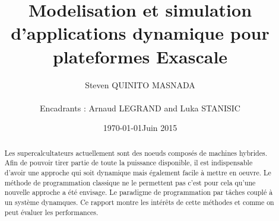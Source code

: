 \documentclass[smallextended]{svjour3}
\date{\today}
\title{}
\begin{document}
\newcommand{\AL}[2][inline]{\todo[color=green!50,#1]{\sf \textbf{AL:} #2}\xspace}
\newcommand{\LS}[2][inline]{\todo[color=green!50,#1]{\sf \textbf{LS:} #2}\xspace}

\let\oldcite=\cite
\renewcommand\cite[2][]{~\ifthenelse{\equal{#1}{}}{\oldcite{#2}}{\oldcite[#1]{#2}}\xspace}
\let\oldref=\ref
\def\ref#1{~\oldref{#1}\xspace}
\def\ie{i.e.,\xspace}
\def\eg{e.g.,\xspace}
\def\qrmspu{\texttt{QRM\_StarPU}\xspace}
\sloppy

\title{Modelisation et simulation d'applications dynamique pour plateformes Exascale%
}


\author{Steven QUINITO MASNADA  \\ \\
        Encadrants : Arnaud LEGRAND and Luka STANISIC  %
}



\date{Juin 2015}

\maketitle


\begin{abstract}

Les supercalcultateurs actuellement sont des noeuds composés de
machines hybrides. Afin de pouvoir tirer partie de toute la
puissance disponible, il est indispensable d'avoir une approche qui
soit dynamique mais également facile à mettre en oeuvre. Le méthode
de programmation classique ne le permettent pas c'est pour cela
qu'une nouvelle approche a été envisage. Le paradigme de
programmation par tâches couplé à un système dynamques. Ce rapport
montre les intérêts de cette méthodes et comme on peut évaluer les
performances. 
\newpage
\end{abstract}
\end{document}
